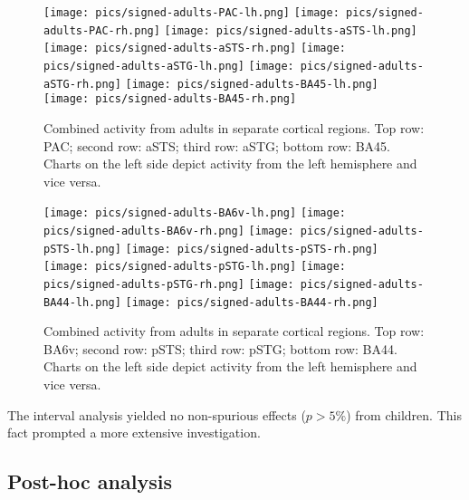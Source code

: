 \begin{figure}[h]
\begin{center}
\texttt{[image: pics/signed-adults-PAC-lh.png]}
\texttt{[image: pics/signed-adults-PAC-rh.png]}
\texttt{[image: pics/signed-adults-aSTS-lh.png]}
\texttt{[image: pics/signed-adults-aSTS-rh.png]}
\texttt{[image: pics/signed-adults-aSTG-lh.png]}
\texttt{[image: pics/signed-adults-aSTG-rh.png]}
\texttt{[image: pics/signed-adults-BA45-lh.png]}
\texttt{[image: pics/signed-adults-BA45-rh.png]}
\caption{\label{4.3.activity.adults.ventral} Combined activity from adults in separate cortical regions. Top row: PAC; second row: aSTS; third row: aSTG; bottom row: BA45. Charts on the left side depict activity from the left hemisphere and vice versa.}
\end{center}
\end{figure}


\begin{figure}[h]
\begin{center}
\texttt{[image: pics/signed-adults-BA6v-lh.png]}
\texttt{[image: pics/signed-adults-BA6v-rh.png]}
\texttt{[image: pics/signed-adults-pSTS-lh.png]}
\texttt{[image: pics/signed-adults-pSTS-rh.png]}
\texttt{[image: pics/signed-adults-pSTG-lh.png]}
\texttt{[image: pics/signed-adults-pSTG-rh.png]}
\texttt{[image: pics/signed-adults-BA44-lh.png]}
\texttt{[image: pics/signed-adults-BA44-rh.png]}
\caption{\label{4.3.activity.adults.ventral} Combined activity from adults in separate cortical regions. Top row: BA6v; second row: pSTS; third row: pSTG; bottom row: BA44. Charts on the left side depict activity from the left hemisphere and vice versa.}
\end{center}
\end{figure}

\clearpage

The interval analysis yielded no non-spurious effects ($p > 5\%$) from children.
This fact prompted a more extensive investigation.

\subsection{Post-hoc analysis}

